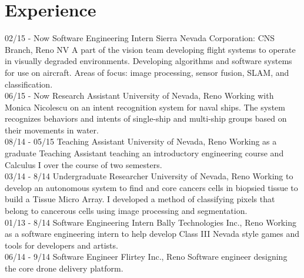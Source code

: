 \documentclass[]{friggeri-cv}
\begin{document}
\section{Experience}
\begin{entrylist}
  \entry
    {02/15 - Now}
    {Software Engineering Intern}
    {Sierra Nevada Corporation: CNS Branch, Reno NV}
    {A part of the vision team developing flight systems to operate in visually degraded environments. Developing algorithms and software systems for use on aircraft. Areas of focus: image processing, sensor fusion, SLAM, and classification.\\}
  \entry
    {06/15 - Now}
    {Research Assistant}
    {University of Nevada, Reno}
    {Working with Monica Nicolescu on an intent recognition system for naval ships. The system recognizes behaviors and intents of single-ship and multi-ship groups based on their movements in water.\\}
  \entry
    {08/14 - 05/15}
    {Teaching Assistant}
    {University of Nevada, Reno}
    {Working as a graduate Teaching Assistant teaching an introductory engineering course and Calculus I over the course of two semesters.\\}
  \entry
    {03/14 - 8/14}
    {Undergraduate Researcher}
    {University of Nevada, Reno}
    {Working to develop an autonomous system to find and core cancers cells in biopsied tissue to build a Tissue Micro Array. I developed a method of classifying pixels that belong to cancerous cells using image processing and segmentation.\\}
    \entry
    {01/13 - 8/14}
    {Software Engineering Intern}
    {Bally Technologies Inc., Reno}
    {Working as a software engineering intern to help develop Class III Nevada style games and tools for developers and artists.\\}
    \entry
    {06/14 - 9/14}
    {Software Engineer}
    {Flirtey Inc., Reno}
    {Software engineer designing the core drone delivery platform.\\}
\end{entrylist}
\end{document}

